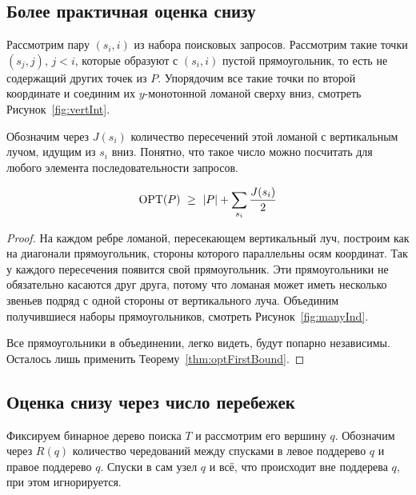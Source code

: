 \subsection{Более практичная оценка снизу}

Рассмотрим пару $(s_i,i)$ из набора поисковых запросов. Рассмотрим такие точки $(s_j, j)$, $j < i$, которые образуют с $(s_i, i)$ пустой прямоугольник, то есть не содержащий других точек из $P$. Упорядочим все такие точки по второй координате и соединим их $y$-монотонной ломаной сверху вниз, смотреть Рисунок~\ref{fig:vertInt}.



Обозначим через $J(s_i)$ количество пересечений этой ломаной с вертикальным лучом, идущим из $s_i$ вниз. Понятно, что такое число можно посчитать для любого элемента последовательности запросов.

\begin{theorem} \label{thm:optIndBound}
\begin{equation} \label{eq:optIndBound}
	\operatorname{OPT}(P)\ \ge\ \lvert P\rvert + \sum_{s_i} \frac{J(s_i)}{2}
\end{equation}
\end{theorem}

\begin{proof}
На каждом ребре ломаной, пересекающем вертикальный луч, построим как на диагонали прямоугольник, стороны которого параллельны осям координат. Так у каждого пересечения появится свой прямоугольник. Эти прямоугольники не обязательно касаются друг друга, потому что ломаная может иметь несколько звеньев подряд с одной стороны от вертикального луча. Объединим получившиеся наборы прямоугольников, смотреть Рисунок~\ref{fig:manyInd}.



Все прямоугольники в объединении, легко видеть, будут попарно независимы. Осталось лишь применить Теорему~\ref{thm:optFirstBound}.
\end{proof}

\subsection{Оценка снизу через число перебежек}

Фиксируем бинарное дерево поиска $T$ и рассмотрим его вершину $q$. Обозначим через $R(q)$ количество чередований между спусками в левое поддерево $q$ и правое поддерево $q$. Спуски в сам узел $q$ и всё, что происходит вне поддерева $q$, при этом игнорируется.

